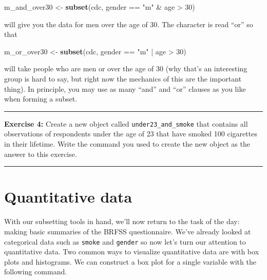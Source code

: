 \documentclass[]{book}
\newenvironment{Shaded}{\begin{snugshade}}{\end{snugshade}}
\newcommand{\KeywordTok}[1]{\textcolor[rgb]{0.13,0.29,0.53}{\textbf{{#1}}}}
\newcommand{\DecValTok}[1]{\textcolor[rgb]{0.00,0.00,0.81}{{#1}}}
\newcommand{\StringTok}[1]{\textcolor[rgb]{0.31,0.60,0.02}{{#1}}}
\newcommand{\NormalTok}[1]{{#1}}
\theoremstyle{definition}
\theoremstyle{definition}
\theoremstyle{definition}
\theoremstyle{remark}
\begin{document}
\begin{Shaded}
\begin{Highlighting}[]
\NormalTok{m_and_over30 <-}\StringTok{ }\KeywordTok{subset}\NormalTok{(cdc, gender ==}\StringTok{ "m"} \NormalTok{&}\StringTok{ }\NormalTok{age >}\StringTok{ }\DecValTok{30}\NormalTok{)}
\end{Highlighting}
\end{Shaded}

will give you the data for men over the age of 30. The
\texttt{\textbar{}} character is read ``or'' so that

\begin{Shaded}
\begin{Highlighting}[]
\NormalTok{m_or_over30 <-}\StringTok{ }\KeywordTok{subset}\NormalTok{(cdc, gender ==}\StringTok{ "m"} \NormalTok{|}\StringTok{ }\NormalTok{age >}\StringTok{ }\DecValTok{30}\NormalTok{)}
\end{Highlighting}
\end{Shaded}

will take people who are men or over the age of 30 (why that's an
interesting group is hard to say, but right now the mechanics of this
are the important thing). In principle, you may use as many ``and'' and
``or'' clauses as you like when forming a subset.

\begin{center}\rule{0.5\linewidth}{\linethickness}\end{center}

\textbf{Exercise 4:} Create a new object called
\texttt{under23\_and\_smoke} that contains all observations of
respondents under the age of 23 that have smoked 100 cigarettes in their
lifetime. Write the command you used to create the new object as the
answer to this exercise.

\begin{center}\rule{0.5\linewidth}{\linethickness}\end{center}

\section{Quantitative data}\label{quantitative-data}

With our subsetting tools in hand, we'll now return to the task of the
day: making basic summaries of the BRFSS questionnaire. We've already
looked at categorical data such as \texttt{smoke} and \texttt{gender} so
now let's turn our attention to quantitative data. Two common ways to
visualize quantitative data are with box plots and histograms. We can
construct a box plot for a single variable with the following command.
\end{document}

